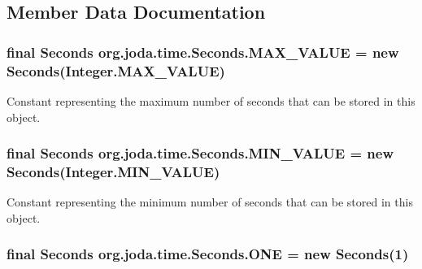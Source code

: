 \subsection{Member Data Documentation}
\hypertarget{classorg_1_1joda_1_1time_1_1_seconds_a33589dbddfc416d9f18da5f0e36caed1}{
\subsubsection[{M\-A\-X\-\_\-\-V\-A\-L\-U\-E}]{\setlength{\rightskip}{0pt plus 5cm}final {\bf Seconds} org.\-joda.\-time.\-Seconds.\-M\-A\-X\-\_\-\-V\-A\-L\-U\-E = new {\bf Seconds}(Integer.\-M\-A\-X\-\_\-\-V\-A\-L\-U\-E)\hspace{0.3cm}{\ttfamily [static]}}}\label{classorg_1_1joda_1_1time_1_1_seconds_a33589dbddfc416d9f18da5f0e36caed1}
Constant representing the maximum number of seconds that can be stored in this object. \hypertarget{classorg_1_1joda_1_1time_1_1_seconds_a44dd49d566cc994da5e5d683c2c4ef7d}{
\subsubsection[{M\-I\-N\-\_\-\-V\-A\-L\-U\-E}]{\setlength{\rightskip}{0pt plus 5cm}final {\bf Seconds} org.\-joda.\-time.\-Seconds.\-M\-I\-N\-\_\-\-V\-A\-L\-U\-E = new {\bf Seconds}(Integer.\-M\-I\-N\-\_\-\-V\-A\-L\-U\-E)\hspace{0.3cm}{\ttfamily [static]}}}\label{classorg_1_1joda_1_1time_1_1_seconds_a44dd49d566cc994da5e5d683c2c4ef7d}
Constant representing the minimum number of seconds that can be stored in this object. \hypertarget{classorg_1_1joda_1_1time_1_1_seconds_acd3a648de2f7043bd31cee6d0b036cf5}{
\subsubsection[{O\-N\-E}]{\setlength{\rightskip}{0pt plus 5cm}final {\bf Seconds} org.\-joda.\-time.\-Seconds.\-O\-N\-E = new {\bf Seconds}(1)\hspace{0.3cm}{\ttfamily [static]}}}\label{classorg_1_1joda_1_1time_1_1_seconds_acd3a648de2f7043bd31cee6d0b036cf5}
